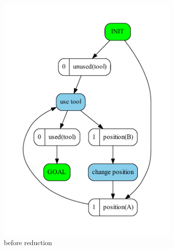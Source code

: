 	\begin{figure}
		\begin{subfigure}[b]{0.4\textwidth}
			\includegraphics[scale=0.4]{oneUsage/figures/startsInInit_input}
			\caption{before reduction}
		\end{subfigure}	
		\begin{subfigure}[b]{0.4\textwidth}

\end{subfigure}
\end{figure}
